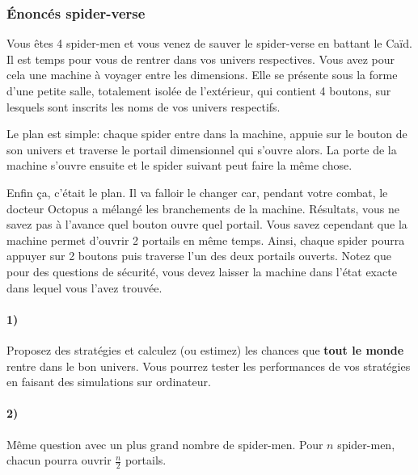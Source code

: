 \documentclass[a4paper,10pt,oneside]{article}
\begin{document}
\newpage
\subsubsection{Énoncés spider-verse}

Vous êtes 4 spider-men et vous venez de sauver le spider-verse en battant le Caïd.
Il est temps pour vous de rentrer dans vos univers respectives.
Vous avez pour cela une machine à voyager entre les dimensions.
Elle se présente sous la forme d'une petite salle, totalement isolée de l'extérieur, qui contient 4 boutons, sur lesquels sont inscrits les noms de vos univers respectifs.

Le plan est simple: chaque spider entre dans la machine, appuie sur le bouton de son univers et traverse le portail dimensionnel qui s'ouvre alors. 
La porte de la machine s'ouvre ensuite et le spider suivant peut faire la même chose.

Enfin ça, c'était le plan. 
Il va falloir le changer car, pendant votre combat, le docteur Octopus a mélangé les branchements de la machine.
Résultats, vous ne savez pas à l'avance quel bouton ouvre quel portail.
Vous savez cependant que la machine permet d'ouvrir 2 portails en même temps.
Ainsi, chaque spider pourra appuyer sur 2 boutons puis traverse l'un des deux portails ouverts.
Notez que pour des questions de sécurité, vous devez laisser la machine dans l'état exacte dans lequel vous l'avez trouvée.


\paragraph*{1)}
Proposez des stratégies et calculez (ou estimez) les chances que \textbf{tout le monde} rentre dans le bon univers.
Vous pourrez tester les performances de vos stratégies en faisant des simulations sur ordinateur.

\paragraph*{2)} 
Même question avec un plus grand nombre de spider-men. Pour $n$ spider-men, chacun pourra ouvrir $\frac{n}{2}$ portails.
\end{document}
